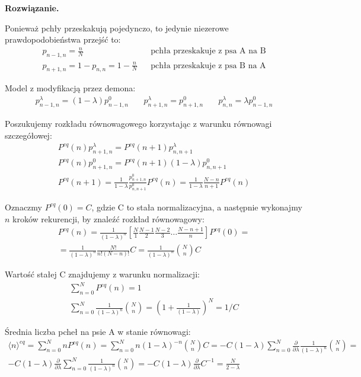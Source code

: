 \documentclass[11pt,a4paper]{article}
\newenvironment{solution}{\vspace{1cm} \par\textbf{Rozwiązanie.} \vspace{1cm}}{}
\begin{document}
\begin{solution}

Ponieważ pchły przeskakują pojedynczo, to jedynie niezerowe prawdopodobieństwa przejść to:
\begin{align*}
  p_{n-1,n} = \frac{n}{N} & & \text{pchła przeskakuje z psa A na B} \\
  p_{n+1,n} = 1 - p_{n,n} = 1 - \frac{n}{N} & &\text{pchła przeskakuje z psa B na A}
\end{align*}

Model z modyfikacją przez demona:
\begin{align*}
p^{\lambda}_{n-1,n} = (1 - \lambda) p^0_{n-1,n}&~& 
p^{\lambda}_{n+1,n} =  p^0_{n+1,n}&~&
p^{\lambda}_{n,n} = \lambda p^0_{n-1,n}
\end{align*}

Poszukujemy rozkładu równowagowego korzystając z warunku równowagi szczegółowej:
\begin{align*}
  P^{eq}(n) p^{\lambda}_{n+1,n} = P^{eq}(n+1) p^{\lambda}_{n,n+1} \\
  P^{eq}(n)  p^0_{n+1,n} = P^{eq}(n+1) (1-\lambda) p^0_{n,n+1} \\
  P^{eq}(n+1) = \frac{1}{1-\lambda} \frac{p^0_{n+1,n}}{p^0_{n,n+1}} P^{eq}(n) =
  \frac{1}{1-\lambda} \frac{N-n}{n+1} P^{eq}(n) 
\end{align*}

Oznaczmy $P^{eq}(0) = C$, gdzie C to stała normalizacyjna, a następnie
wykonajmy $n$ kroków rekurencji, by znaleźć rozkład równowagowy:
\begin{align*}
  P^{eq}(n) = \frac{1}{(1-\lambda)^{n}} \left[ \frac{N}{1}\frac{N-1}{2}\frac{N-2}{3} \ldots  \frac{N-n+1}{n} \right] P^{eq}(0) = \\
  = \frac{1}{(1-\lambda)^{n}} \frac{N!}{n!(N-n)!} C =
  \frac{1}{(1-\lambda)^{n}} \binom{N}{n} C
\end{align*}

Wartość stałej C znajdujemy z warunku normalizacji:
\begin{align*}
  \sum_{n=0}^N P^{eq}(n) = 1 \\
  \sum_{n=0}^N \frac{1}{(1-\lambda)^{n}} \binom{N}{n} = 
  \left( 1 + \frac{1}{(1-\lambda)} \right)^N = 1/C
\end{align*}

Średnia liczba pcheł na psie A w stanie równowagi:
\begin{align*}
  \langle n \rangle^{eq} = \sum_{n=0}^N n P^{eq}(n) = 
  \sum_{n=0}^N n (1-\lambda)^{-n} \binom{N}{n} C = 
  -C (1-\lambda) \sum_{n=0}^N \frac{\partial}{\partial{\lambda}}\frac{1}{(1-\lambda)^{n}} \binom{N}{n} = \\
  -C (1-\lambda) \frac{\partial}{\partial{\lambda}} \sum_{n=0}^N \frac{1}{(1-\lambda)^{n}} \binom{N}{n} = 
  -C (1-\lambda) \frac{\partial}{\partial{\lambda}} C^{-1} = 
  \frac{N}{2-\lambda}
\end{align*}


\end{solution}
\end{document}
